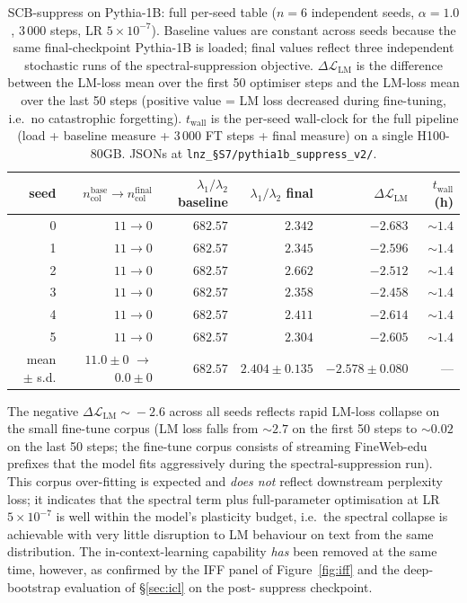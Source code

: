 \documentclass[11pt,a4paper]{article}
\begin{document}
\begin{table}[h]
\centering
\small
\caption{SCB-suppress on Pythia-1B: full per-seed table
($n\!=\!6$ independent seeds, $\alpha\!=\!1.0$, 3\,000 steps,
LR $5\!\times\!10^{-7}$). Baseline values are constant across
seeds because the same final-checkpoint Pythia-1B is loaded;
final values reflect three independent stochastic runs of the
spectral-suppression objective. $\Delta\mathcal{L}_\mathrm{LM}$
is the difference between the LM-loss mean over the first 50
optimiser steps and the LM-loss mean over the last 50 steps
(positive value = LM loss decreased during fine-tuning, i.e.\
no catastrophic forgetting). $t_\mathrm{wall}$ is the per-seed
wall-clock for the full pipeline (load + baseline measure +
3\,000 FT steps + final measure) on a single H100-80GB.
JSONs at \texttt{lnz\_§S7/pythia1b\_suppress\_v2/}.}
\label{tab:S7-suppress}
\begin{tabular}{rrrrrr}
\toprule
seed & $n_\mathrm{col}^\mathrm{base}\!\to\!n_\mathrm{col}^\mathrm{final}$
     & $\lambda_1/\lambda_2$ baseline & $\lambda_1/\lambda_2$ final
     & $\Delta\mathcal{L}_\mathrm{LM}$ & $t_\mathrm{wall}$ (h) \\
\midrule
0 & $11 \to 0$ & $682.57$ & $2.342$ & $-2.683$ & $\sim 1.4$ \\
1 & $11 \to 0$ & $682.57$ & $2.345$ & $-2.596$ & $\sim 1.4$ \\
2 & $11 \to 0$ & $682.57$ & $2.662$ & $-2.512$ & $\sim 1.4$ \\
3 & $11 \to 0$ & $682.57$ & $2.358$ & $-2.458$ & $\sim 1.4$ \\
4 & $11 \to 0$ & $682.57$ & $2.411$ & $-2.614$ & $\sim 1.4$ \\
5 & $11 \to 0$ & $682.57$ & $2.304$ & $-2.605$ & $\sim 1.4$ \\
\midrule
mean $\pm$ s.d. & $11.0 \pm 0$ $\to$ $0.0 \pm 0$ & $682.57$ &
   $2.404 \pm 0.135$ & $-2.578 \pm 0.080$ & --- \\
\bottomrule
\end{tabular}
\end{table}

The negative $\Delta\mathcal{L}_\mathrm{LM}\!\sim\!-2.6$ across all
seeds reflects rapid LM-loss collapse on the small fine-tune corpus
(LM loss falls from $\sim\!2.7$ on the first 50 steps to
$\sim\!0.02$ on the last 50 steps; the fine-tune corpus consists of
streaming FineWeb-edu prefixes that the model fits aggressively
during the spectral-suppression run). This corpus over-fitting is
expected and \emph{does not} reflect downstream perplexity loss; it
indicates that the spectral term plus full-parameter optimisation at
LR $5\!\times\!10^{-7}$ is well within the model's plasticity budget,
i.e.\ the spectral collapse is achievable with very little
disruption to LM behaviour on text from the same distribution. The
in-context-learning capability \emph{has} been removed at the same
time, however, as confirmed by the IFF panel of Figure~\ref{fig:iff}
and the deep-bootstrap evaluation of \S\ref{sec:icl} on the post-
suppress checkpoint.
\end{document}
